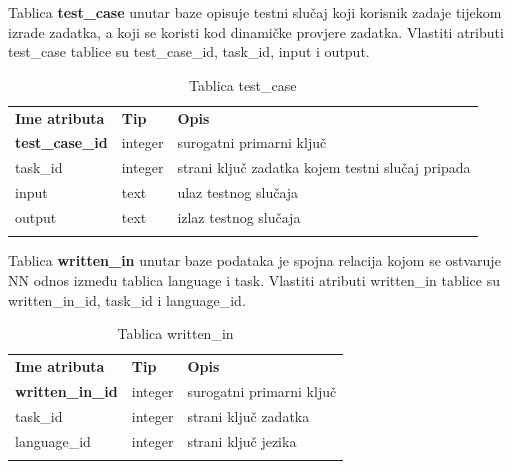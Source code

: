 \documentclass[times, utf8, zavrsni, numeric]{fer}
\begin{document}
		Tablica \textbf{test\_case} unutar baze opisuje testni slučaj koji korisnik zadaje tijekom izrade zadatka, a koji se koristi kod dinamičke provjere zadatka. Vlastiti atributi test\_case tablice su test\_case\_id, task\_id, input i output. 
		\begin{table}[H]
			\caption{Tablica test\_case}
			\label{tbl:testcase}
			\centering
			\begin{tabu} to \textwidth {XXX}
				\tabucline[1.75pt]{-}
				\textbf{Ime atributa} & \textbf{Tip} & \textbf{Opis}\\ 				
				\tabucline[1.75pt]{-}
				\textbf{test\_case\_id} & integer & surogatni primarni ključ\\ \hline
				task\_id & integer & strani ključ zadatka kojem testni slučaj pripada\\ \hline
				input & text & ulaz testnog slučaja\\ \hline
				output & text & izlaz testnog slučaja\\ \hline
				\tabucline[1.75pt]{-}
			\end{tabu}
		\end{table}
		
		Tablica \textbf{written\_in} unutar baze podataka je spojna relacija kojom se ostvaruje NN odnos između tablica language i task. Vlastiti atributi written\_in tablice su written\_in\_id, task\_id i language\_id. 
		\begin{table}[H]
			\caption{Tablica written\_in}
			\label{tbl:writtenin}
			\centering
			\begin{tabu} to \textwidth {XXX}
				\tabucline[1.75pt]{-}
				\textbf{Ime atributa} & \textbf{Tip} & \textbf{Opis}\\ 				
				\tabucline[1.75pt]{-}
				\textbf{written\_in\_id} & integer & surogatni primarni ključ\\ \hline
				task\_id & integer & strani ključ zadatka\\ \hline
				language\_id & integer & strani ključ jezika\\ \hline
				\tabucline[1.75pt]{-}
			\end{tabu}
		\end{table}
		
\end{document}
